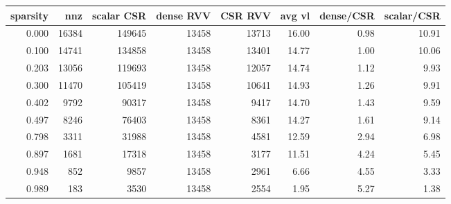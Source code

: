 \begin{tabular}{rrrrrrrr}
\toprule
sparsity & nnz & scalar CSR & dense RVV & CSR RVV & avg vl & dense/CSR & scalar/CSR \\
\midrule
0.000 & 16384 & 149645 & 13458 & 13713 & 16.00 & 0.98 & 10.91 \\
0.100 & 14741 & 134858 & 13458 & 13401 & 14.77 & 1.00 & 10.06 \\
0.203 & 13056 & 119693 & 13458 & 12057 & 14.74 & 1.12 & 9.93 \\
0.300 & 11470 & 105419 & 13458 & 10641 & 14.93 & 1.26 & 9.91 \\
0.402 & 9792 & 90317 & 13458 & 9417 & 14.70 & 1.43 & 9.59 \\
0.497 & 8246 & 76403 & 13458 & 8361 & 14.27 & 1.61 & 9.14 \\
0.798 & 3311 & 31988 & 13458 & 4581 & 12.59 & 2.94 & 6.98 \\
0.897 & 1681 & 17318 & 13458 & 3177 & 11.51 & 4.24 & 5.45 \\
0.948 & 852 & 9857 & 13458 & 2961 & 6.66 & 4.55 & 3.33 \\
0.989 & 183 & 3530 & 13458 & 2554 & 1.95 & 5.27 & 1.38 \\
\bottomrule
\end{tabular}
